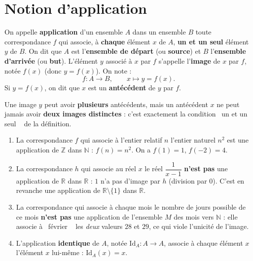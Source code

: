 \documentclass[a4paper,12pt,openany]{book}
\providecommand{\og}{\guillemotleft~}
\providecommand{\fg}{\ifhmode~\fi\guillemotright}
\begin{document}
\section{Notion d'application}

\begin{definition}
On appelle \textbf{application} d'un ensemble $A$ dans un ensemble $B$ toute
correspondance $f$ qui associe, à \textbf{chaque} élément $x$ de $A$, \textbf{un
et un seul} élément $y$ de $B$. On dit que $A$ est l'\textbf{ensemble de
départ} (ou \textbf{source}) et $B$ l'\textbf{ensemble d'arrivée} (ou
\textbf{but}). L'élément $y$ associé à $x$ par $f$ s'appelle l'\textbf{image}
de $x$ par $f$, notée $f(x)$ (donc $y=f(x)$). On note :
\[
f : A \longrightarrow B, \qquad x \longmapsto y=f(x).
\]
Si $y=f(x)$, on dit que $x$ est un \textbf{antécédent} de $y$ par $f$.
\end{definition}

\begin{remarque}
Une image $y$ peut avoir \textbf{plusieurs} antécédents, mais un antécédent
$x$ ne peut jamais avoir \textbf{deux images distinctes} : c'est exactement
la condition \og un et un seul \fg{} de la définition.
\end{remarque}

\begin{exemple}[3.1]
\begin{enumerate}
  \item La correspondance $f$ qui associe à l'entier relatif $n$ l'entier
  naturel $n^2$ est une application de $\mathbb{Z}$ dans $\mathbb{N}$ :
  $f(n)=n^2$. On a $f(1)=1$, $f(-2)=4$.
  \item La correspondance $h$ qui associe au réel $x$ le réel
  $\dfrac{1}{x-1}$ \textbf{n'est pas} une application de $\mathbb{R}$ dans
  $\mathbb{R}$ : $1$ n'a pas d'image par $h$ (division par $0$). C'est en
  revanche une application de $\mathbb{R}\setminus\{1\}$ dans $\mathbb{R}$.
  \item La correspondance qui associe à chaque mois le nombre de jours
  possible de ce mois \textbf{n'est pas} une application de l'ensemble $M$
  des mois vers $\mathbb{N}$ : elle associe à \og février \fg{} les
  \emph{deux} valeurs $28$ et $29$, ce qui viole l'unicité de l'image.
  \item L'application \textbf{identique} de $A$, notée $\mathrm{Id}_A : A \to
  A$, associe à chaque élément $x$ l'élément $x$ lui-même :
  $\mathrm{Id}_A(x)=x$.
\end{enumerate}
\end{exemple}
\end{document}
